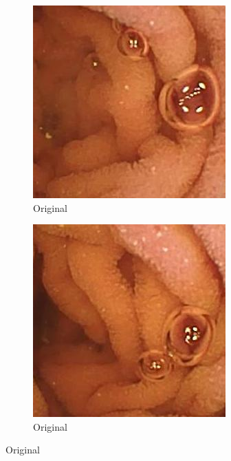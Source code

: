 \begin{figure}[H]
\begin{subfigure}[b]{0.32\textwidth}
    \includegraphics[width=\textwidth]{Chapter7/hr_445.jpg}
    \caption{Original}
  \end{subfigure}
  \begin{subfigure}[b]{0.32\textwidth}
    \includegraphics[width=\textwidth]{Chapter7/hr_456.jpg}
    \caption{Original}
  \end{subfigure}


\end{figure}
